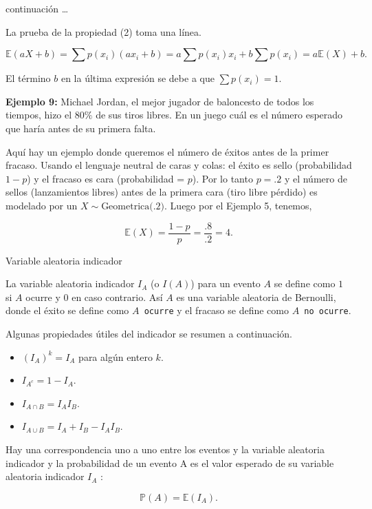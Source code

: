 \documentclass[10pt]{beamer}
\begin{document}
\begin{frame}{continuaci\'on \dots}
\small{

La prueba de la propiedad (2) toma una l\'inea.

\[
\mathbb{E}(aX + b) = \sum p(x_i)(ax_i + b) = a\sum p(x_i)x_i + b\sum p(x_i) = a\mathbb{E}(X) + b.
\]

El t\'ermino $b$ en la \'ultima expresi\'on se debe a que $\displaystyle \sum p(x_i) =1$.}

\vspace{0.8 cm}

\scriptsize{
\textbf{Ejemplo 9:} Michael Jordan, el mejor jugador de baloncesto de todos los tiempos, hizo el $80\%$ de sus tiros libres. En un juego cu\'al es el n\'umero esperado que har\'ia antes de su primera falta.

Aqu\'i hay un ejemplo donde queremos el n\'umero de \'exitos antes de la primer fracaso. Usando el lenguaje neutral de caras y colas: el \'exito es sello (probabilidad $1 - p$) y el fracaso es cara (probabilidad = $p$). Por lo tanto $p =.2$ y el n\'umero de sellos (lanzamientos libres) antes de la primera cara (tiro libre p\'erdido) es modelado por un $X \sim \text{Geometrica(.2)}$. Luego por el Ejemplo 5, tenemos, 

\[
\mathbb{E}(X) = \frac{1 - p}{p}= \frac{.8}{.2} = 4.
\]

}

\end{frame}

\begin{frame}{Variable aleatoria indicador}
\small{ La variable aleatoria indicador $I_A$ (o $I(A)$) para un evento $A$ se define como $1$ si $A$ ocurre y $0$ en caso contrario. As\'i  $A$ es una variable aleatoria de Bernoulli, donde el \'exito se define como \texttt{$A$ ocurre} y el fracaso se define como \texttt{$A$ no ocurre}.
	
Algunas propiedades \'utiles del indicador  se resumen a continuaci\'on.

\begin{itemize}
	\item $(I_A)^k = I_A$ para alg\'un entero $k$.
	\item $I_{A^c} = 1 -I_A$.
	\item $I_{A \cap B} = I_AI_B$.
	\item $I_{A \cup B} = I_A + I_B - I_AI_B$.
\end{itemize}
	
Hay una correspondencia uno a uno entre los eventos y la variable aleatoria indicador  y la probabilidad de un evento A es el valor esperado de su variable aleatoria  indicador $I_A$ :

\begin{equation}
\mathbb{P}(A) = \mathbb{E}(I_A).
\end{equation}
}
\end{frame}
\end{document}
